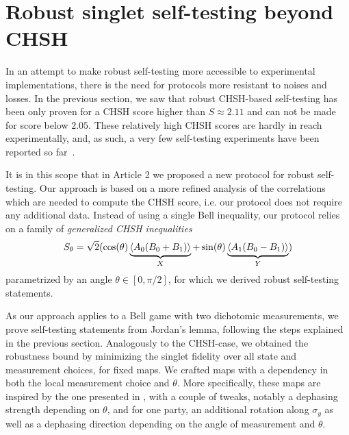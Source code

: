 \section{Robust singlet self-testing beyond CHSH}
\label{sec:robust_XY}

In an attempt to make robust self-testing more accessible to experimental implementations, there is the need for protocols more resistant to noises and losses.
In the previous section, we saw that robust CHSH-based self-testing has been only proven for a CHSH score higher than $S\approx 2.11$ and can not be made for score below $2.05$.
These relatively high CHSH scores are hardly in reach experimentally, and, as such, a very few self-testing experiments have been reported so far~\cite{Tan2017,Bancal2021}.

It is in this scope that in Article 2 we proposed a new protocol for robust self-testing.
Our approach is based on a more refined analysis of the correlations which are needed to compute the CHSH score, i.e. our protocol does not require any additional data.
Instead of using a single Bell inequality, our protocol relies on a family of \textit{generalized CHSH inequalities}
\begin{equation}
	S_\theta = \sqrt{2}(\cos(\theta) \underbrace{\langle {A_0(B_0+B_1)} \rangle}_{X} + \sin(\theta)\underbrace{\langle {A_1(B_0-B_1)} \rangle}_{Y})
	\label{eq:generalized_CHSH}
\end{equation}
parametrized by an angle $\theta \in [0,\pi/2]$, for which we derived robust self-testing statements.

As our approach applies to a Bell game with two dichotomic measurements, we prove self-testing statements from Jordan's lemma, following the steps explained in the previous section. 
Analogously to the CHSH-case, we obtained the robustness bound by minimizing the singlet fidelity over all state and measurement choices, for fixed maps.
We crafted maps with a dependency in both the local measurement choice and $\theta$.
More specifically, these maps are inspired by the one presented in , with a couple of tweaks, notably a dephasing strength depending on $\theta$, and for one party, an additional rotation along $\sigma_y$ as well as a dephasing direction depending on the angle of measurement and $\theta$.

